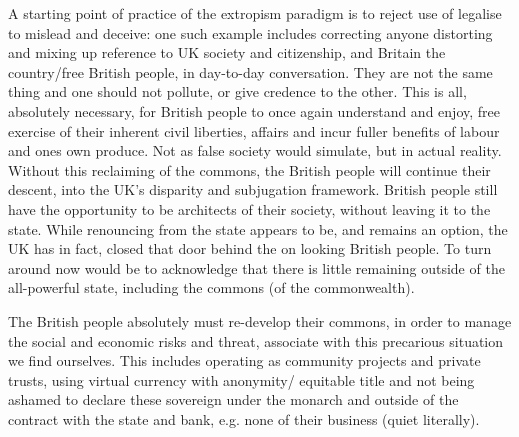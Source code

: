\documentclass[letterpaper,10pt,openany,oneside,english]{sphinxmanual}
\begin{document}
A starting point of practice of the extropism paradigm is to reject use of legalise to mislead and deceive: one such example includes correcting anyone distorting and mixing up reference to UK society and citizenship, and Britain the country/free British people, in day-to-day conversation. They are not the same thing and one should not pollute, or give credence to the other. This is all, absolutely necessary, for British people to once again understand and enjoy, free exercise of their inherent civil liberties, affairs and incur fuller benefits of labour and ones own produce. Not as false society would simulate, but in actual reality. Without this reclaiming of the commons, the British people will continue their descent, into the UK’s disparity and subjugation framework. British people still have the opportunity to be architects of their society, without leaving it to the state. While renouncing from the state appears to be, and remains an option, the UK has in fact, closed that door behind the on looking British people. To turn around now would be to acknowledge that there is little remaining outside of the all-powerful state, including the commons (of the commonwealth).

The British people absolutely must re-develop their commons, in order to manage the social and economic risks and threat, associate with this precarious situation we find ourselves. This includes operating as community projects and private trusts, using virtual currency with anonymity/ equitable title and not being ashamed to declare these sovereign under the monarch and outside of the contract with the state and bank, e.g. none of their business (quiet literally).
\end{document}
